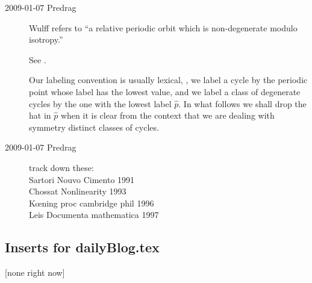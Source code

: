 \begin{description}
\item[2009-01-07 Predrag]

Wulff refers to ``a relative periodic orbit which
is non-degenerate modulo isotropy.''

See
.



Our labeling convention is usually
lexical, \ie, we label a cycle by the periodic point whose label has the
lowest value, and we label a class of degenerate cycles
by the one with the lowest label $\hat{p}$.
In what follows we shall drop the hat in $\hat{p}$ when it is clear
from the context that we are dealing with symmetry distinct classes
of cycles.



\item[2009-01-07 Predrag] track down these: \\
Sartori Nouvo Cimento 1991 \\
Chossat Nonlinearity 1993  \\
K{\oe}ning proc cambridge phil 1996 \\
Leis Documenta mathematica 1997


\end{description}


\subsection{Inserts for dailyBlog.tex}

[none right now]
